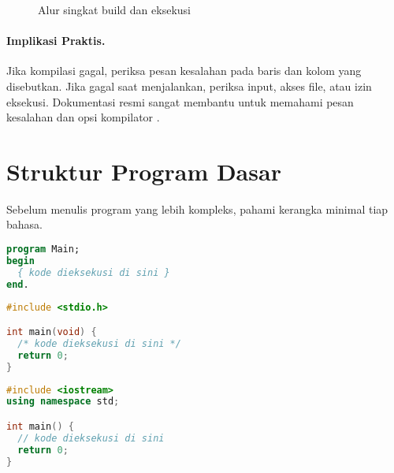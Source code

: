 \documentclass[../main.tex]{subfiles}
\begin{document}
\begin{figure}[H]
  \centering
  \caption{Alur singkat build dan eksekusi}
  \label{fig:build-run-flow}
\end{figure}

\paragraph{Implikasi Praktis.} Jika kompilasi gagal, periksa pesan kesalahan pada baris dan kolom yang disebutkan. Jika gagal saat menjalankan, periksa input, akses file, atau izin eksekusi. Dokumentasi resmi sangat membantu untuk memahami pesan kesalahan dan opsi kompilator \parencite{free-pascal-docs,gnu-c-manual}.

\section{Struktur Program Dasar}
Sebelum menulis program yang lebih kompleks, pahami kerangka minimal tiap bahasa.

\begin{lstlisting}[language=Pascal, caption={Kerangka program Pascal}]
program Main;
begin
  { kode dieksekusi di sini }
end.
\end{lstlisting}

\begin{lstlisting}[language=C, caption={Kerangka program C}]
#include <stdio.h>

int main(void) {
  /* kode dieksekusi di sini */
  return 0;
}
\end{lstlisting}

\begin{lstlisting}[language=C++, caption={Kerangka program C++}]
#include <iostream>
using namespace std;

int main() {
  // kode dieksekusi di sini
  return 0;
}
\end{lstlisting}
\end{document}
